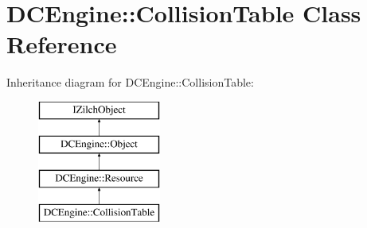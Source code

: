 \hypertarget{classDCEngine_1_1CollisionTable}{\section{D\-C\-Engine\-:\-:Collision\-Table Class Reference}
\label{classDCEngine_1_1CollisionTable}
}
Inheritance diagram for D\-C\-Engine\-:\-:Collision\-Table\-:\begin{figure}[H]
\begin{center}
\leavevmode
\includegraphics[height=4.000000cm]{classDCEngine_1_1CollisionTable}
\end{center}
\end{figure}
